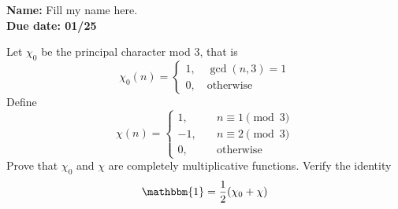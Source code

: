 \documentclass[11pt,letterpaper]{article}
\newcommand{\homework}[2]{\noindent\textbf{Name: }{Fill my name here.} \hfill \textbf{} \\  \textbf{Due date: #2} \hfill \textbf{}\\}
\DeclareMathOperator{\1}{\mathbbm{1}}
\begin{document}
\homework{\#}{01/25}


\begin{exercise}
  Let $\chi_0$ be the principal character mod $3$, that is
  \[\chi_0 (n) = \begin{cases}
      1 , \quad \gcd(n,3)=1 \\
      0, \quad \text{otherwise}
    \end{cases}\]
  Define
  \[\chi(n) = \begin{cases}
      1, \quad  & n \equiv 1 \pmod 3 \\
      -1, \quad & n \equiv 2 \pmod 3 \\
      0, \quad  & \text{otherwise}
    \end{cases}\]
  Prove that $\chi_0$ and $\chi$ are completely multiplicative functions. Verify the identity
  \[ \mathbbm{1} = \dfrac{1}{2}(\chi_0 +\chi)\]
\end{exercise}
\end{document}
